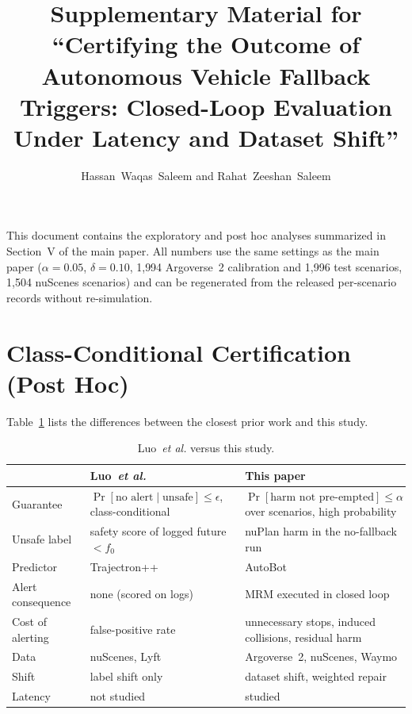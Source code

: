 \documentclass[lettersize,journal]{IEEEtran}
\begin{document}
\title{Supplementary Material for\\ ``Certifying the Outcome of Autonomous
Vehicle Fallback Triggers: Closed-Loop Evaluation Under Latency and Dataset Shift''}
\author{Hassan~Waqas~Saleem and Rahat~Zeeshan~Saleem}
\maketitle

This document contains the exploratory and post hoc analyses summarized
in Section~V of the main paper. All numbers use the same settings as the
main paper ($\alpha = 0.05$, $\delta = 0.10$, 1{,}994 Argoverse~2
calibration and 1{,}996 test scenarios, 1{,}504 nuScenes scenarios) and
can be regenerated from the released per-scenario records without
re-simulation.

\section{Class-Conditional Certification (Post Hoc)}
\label{sec:s-luo}
Table~\ref{tab:luo} lists the differences between the closest prior
work and this study.

\begin{table}[h]
\caption{Luo~\emph{et al.} versus this study.}
\label{tab:luo}
\centering
\scriptsize
\setlength{\tabcolsep}{3pt}
\begin{tabular}{p{1.9cm}p{2.85cm}p{2.85cm}}
\toprule
 & Luo~\emph{et al.} & This paper \\
\midrule
Guarantee & $\Pr[\text{no alert}\mid\text{unsafe}]\le\epsilon$, class-conditional & $\Pr[\text{harm not pre-empted}]\le\alpha$ over scenarios, high probability \\
Unsafe label & safety score of logged future $<f_0$ & nuPlan harm in the no-fallback run \\
Predictor & Trajectron++ & AutoBot \\
Alert consequence & none (scored on logs) & MRM executed in closed loop \\
Cost of alerting & false-positive rate & unnecessary stops, induced collisions, residual harm \\
Data & nuScenes, Lyft & Argoverse~2, nuScenes, Waymo \\
Shift & label shift only & dataset shift, weighted repair \\
Latency & not studied & studied \\
\bottomrule
\end{tabular}
\end{table}
\end{document}
